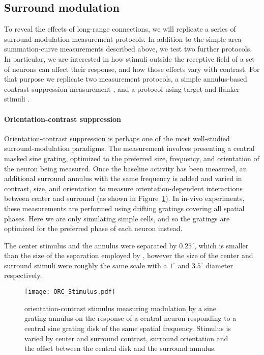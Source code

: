 \subsection{Surround modulation}

To reveal the effects of long-range connections, we will replicate a
series of surround-modulation measurement protocols. In addition to
the simple area-summation-curve measurements described above, we test
two further protocols.  In particular, we are interested in how
stimuli outside the receptive field of a set of neurons can affect
their response, and how those effects vary with contrast. For that
purpose we replicate two measurement protocols, a simple annulus-based
contrast-suppression measurement \citep{Jones2002}, and a protocol
using target and flanker stimuli \citep{Kapadia1995}.

\paragraph{Orientation-contrast suppression}

Orientation-contrast suppression is perhaps one of the most 
well-studied surround-modulation paradigms. The measurement involves
presenting a central masked sine grating, optimized to the
preferred size, frequency, and orientation of the neuron being
measured. Once the baseline activity has been measured, an additional
surround annulus with the same frequency is added and varied in
contrast, size,
 and orientation to measure orientation-dependent
interactions between center and surround (as shown in
Figure~\ref{ORC_Stimulus}). In in-vivo experiments, these measurements
are performed using drifting gratings covering all spatial phases.
Here we are only simulating simple cells, and so the gratings are
optimized for the preferred phase of each neuron instead.

The center stimulus and the annulus were separated by $0.25^\circ$,
which is smaller than the size of the separation employed by
\cite{Jones2002}, however the size of the center and surround stimuli
were roughly the same scale with a $1^\circ$ and $3.5^\circ$ diameter
respectively.

\begin{figure}
	\centering
        \texttt{[image: ORC\_Stimulus.pdf]}
	\caption{orientation-contrast stimulus measuring modulation by a
      sine grating annulus on the response of a central neuron
      responding to a central sine grating disk of the same spatial frequency.
      Stimulus is varied by center and surround contrast, surround
      orientation and the offset between the central disk and the
      surround annulus.}
	\label{ORC_Stimulus}
\end{figure}

